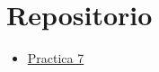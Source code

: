 \documentclass{article}
\begin{document}
%
% 
% 
%

\section{Repositorio}\label{sec:Repositorio}
\begin{itemize}
    \item {\color{blue}\href{https://github.com/pintovillamar/software-construction/tree/main/test/new5}{Practica 7}}
\end{itemize}
\end{document}
